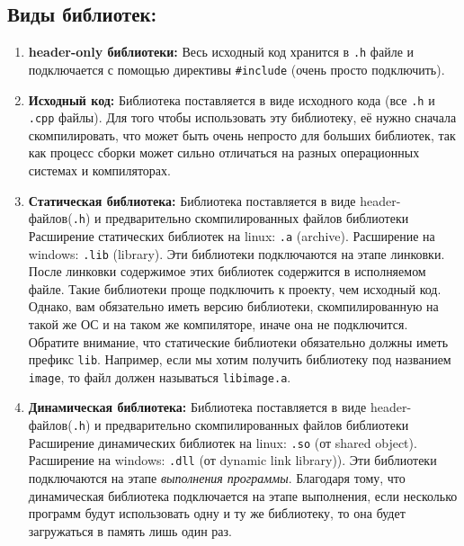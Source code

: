 \documentclass{article}
\begin{document}
\subsection*{Виды библиотек:}
\begin{enumerate}
\item \textbf{header-only библиотеки:} Весь исходный код хранится в \texttt{.h} файле и подключается с помощью директивы \texttt{\#include} (очень просто подключить).
\item \textbf{Исходный код:} Библиотека поставляется в виде исходного кода (все \texttt{.h} и \texttt{.cpp} файлы). Для того чтобы использовать эту библиотеку, её нужно сначала скомпилировать, что может быть очень непросто для больших библиотек, так как процесс сборки может сильно отличаться на разных операционных системах и компиляторах.
\item \textbf{Статическая библиотека:} Библиотека поставляется в виде header-файлов(\texttt{.h}) и предварительно скомпилированных файлов библиотеки Расширение статических библиотек на linux: \texttt{.a} (archive). Расширение на windows: \texttt{.lib} (library). Эти библиотеки подключаются на этапе линковки. После линковки содержимое этих библиотек содержится в исполняемом файле. Такие библиотеки проще подключить к проекту, чем исходный код. Однако, вам обязательно иметь версию библиотеки, скомпилированную на такой же ОС и на таком же компиляторе, иначе она не подключится. Обратите внимание, что статические библиотеки обязательно должны иметь префикс \texttt{lib}. Например, если мы хотим получить библиотеку под названием \texttt{image}, то файл должен называться \texttt{libimage.a}.
\item \textbf{Динамическая библиотека:} Библиотека поставляется в виде header-файлов(\texttt{.h}) и предварительно скомпилированных файлов библиотеки Расширение динамических библиотек на linux: \texttt{.so} (от shared object). Расширение на windows: \texttt{.dll} (от dynamic link library)). Эти библиотеки подключаются на этапе \textit{выполнения программы}. Благодаря тому, что динамическая библиотека подключается на этапе выполнения, если несколько программ будут использовать одну и ту же библиотеку, то она будет загружаться в память лишь один раз.
\end{enumerate}
\end{document}
